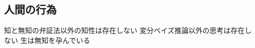 \subsection{人間の行為}\label{ux4ebaux9593ux306eux884cux70ba}

知と無知の弁証法以外の知性は存在しない
変分ベイズ推論以外の思考は存在しない 生は無知を孕んでいる
